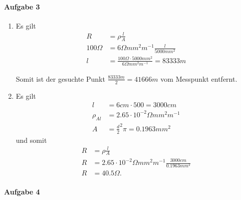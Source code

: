 \documentclass{article}
\begin{document}
\paragraph{Aufgabe 3}

\begin{enumerate}
    \item Es gilt
    \begin{align*}
        R &= \rho \frac{l}{A} \\
        100 \Omega &= 6 \Omega mm^2 m^{-1} \frac{l}{5000mm^2} \\
        l &= \frac{100 \Omega \cdot 5000 mm^2}{6 \Omega mm^2 m^{-1}} = 83333m
    \end{align*}

    Somit ist der gesuchte Punkt $\frac{83333m}{2} = 41666m$ vom Messpunkt entfernt.

    \item Es gilt
    \begin{align*}
        l &= 6cm \cdot 500 = 3000cm \\
        \rho_{Al} &= 2.65 \cdot 10^{-2} \Omega mm^2 m^{-1} \\
        A &= \frac{d}{2}^2 \pi = 0.1963mm^2
    \end{align*}
    und somit
    \begin{align*}
        R &= \rho \frac{l}{A} \\
        R &= 2.65 \cdot 10^{-2} \Omega mm^2 m^{-1} \frac{3000cm}{0.1963mm^2} \\
        R &= 40.5 \Omega.
    \end{align*}
\end{enumerate}

\paragraph{Aufgabe 4}
\end{document}
